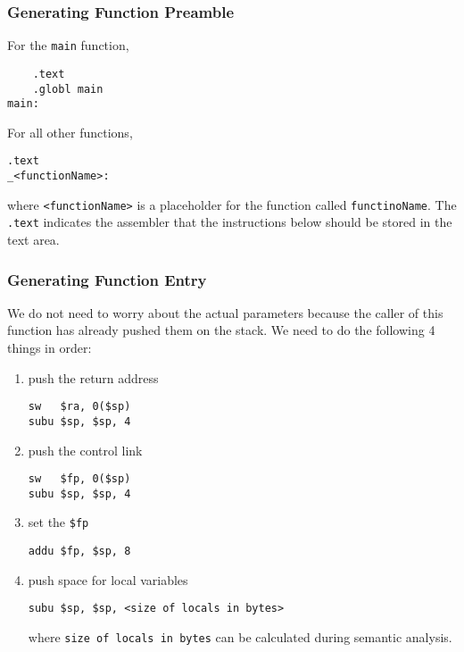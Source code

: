 \documentclass[11pt]{article}
\begin{document}
\subsubsection{Generating Function Preamble}
\label{sec:org93ebb39}
For the \texttt{main} function,
\begin{verbatim}
    .text
    .globl main
main:
\end{verbatim}
For all other functions,
\begin{verbatim}
.text
_<functionName>:
\end{verbatim}
where \texttt{<functionName>} is a placeholder for the function called \texttt{functinoName}.
The \texttt{.text} indicates the assembler that the instructions below should be stored in the text area.
\subsubsection{Generating Function Entry}
\label{sec:org0778189}
We do not need to worry about the actual parameters because the caller of this function has
already pushed them on the stack.
We need to do the following 4 things in order:
\begin{enumerate}
\item push the return address
\begin{verbatim}
sw   $ra, 0($sp)
subu $sp, $sp, 4
\end{verbatim}
\item push the control link
\begin{verbatim}
sw   $fp, 0($sp)
subu $sp, $sp, 4
\end{verbatim}
\item set the \texttt{\$fp}
\begin{verbatim}
addu $fp, $sp, 8
\end{verbatim}
\item push space for local variables
\begin{verbatim}
subu $sp, $sp, <size of locals in bytes>
\end{verbatim}
where \texttt{size of locals in bytes} can be calculated during semantic analysis.
\end{enumerate}
\end{document}
